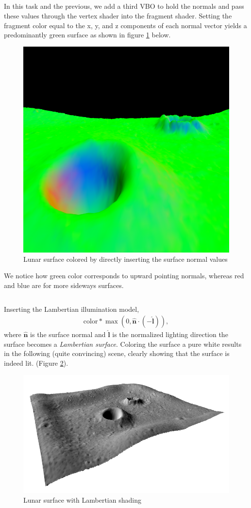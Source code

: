 \documentclass[]{article}
\begin{document}
\begin{multicols}{2}
\subsection{}
In this task and the previous, we add a third VBO to hold the normals and pass these values through the vertex shader into the fragment shader. Setting the fragment color equal to the x, y, and z components of each normal vector yields a predominantly green surface as shown in figure \ref{fig:green-surface} below.
\begin{figure}[H]
\centering
\includegraphics[width=0.5\columnwidth]{green-surface}
\caption{Lunar surface colored by directly inserting the surface normal values}
\label{fig:green-surface}
\end{figure}
We notice how green color corresponds to upward pointing normals, whereas red and blue are for more sideways surfaces.

\subsection{}
Inserting the Lambertian illumination model,
\begin{equation}\begin{aligned}
\text{color} * \max(0, \hat{\mathbf{n}} \cdot (- \hat{\mathbf{l}})),
\end{aligned}\end{equation}
where $\hat{\mathbf{n}}$ is the surface normal and $\hat{\mathbf{l}}$ is the normalized lighting direction the surface becomes a \textit{Lambertian surface}. Coloring the surface a pure white results in the following (quite convincing) scene, clearly showing that the surface is indeed lit. (Figure \ref{fig:lambert-surface}).
\begin{figure}[H]
\centering
\includegraphics[width=0.5\columnwidth]{lambert-surface}
\caption{Lunar surface with Lambertian shading}
\label{fig:lambert-surface}
\end{figure}

\end{multicols}
\end{document}
